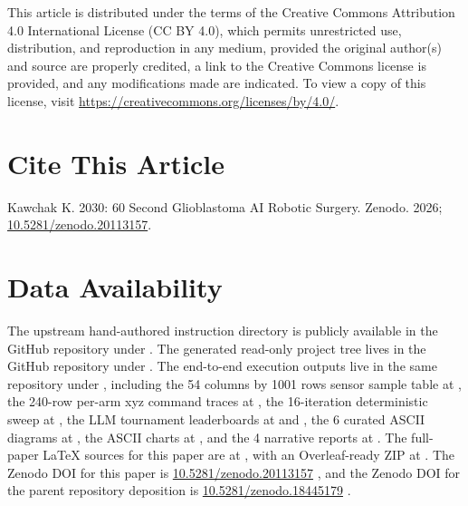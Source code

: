 This article is distributed under the terms of the Creative Commons
Attribution 4.0 International License (CC BY 4.0), which permits
unrestricted use, distribution, and reproduction in any medium,
provided the original author(s) and source are properly credited, a
link to the Creative Commons license is provided, and any
modifications made are indicated. To view a copy of this license,
visit \url{https://creativecommons.org/licenses/by/4.0/}.

{}
\section*{Cite This Article}
\label{sec:cite}

Kawchak K. 2030: 60 Second Glioblastoma AI Robotic Surgery. Zenodo.
2026; \href{https://doi.org/10.5281/zenodo.20113157}{10.5281/zenodo.20113157}.

{}
\section*{Data Availability}
\label{sec:data}

The upstream hand-authored instruction directory is publicly available
in the  GitHub
repository under
\cite{one-minute-variant-instructions}. The generated read-only
project tree lives in the  GitHub
repository under 
\cite{repo-robotic-surgeries}. The end-to-end execution outputs live
in the same repository under , including
the 54 columns by 1001 rows sensor sample table at
, the
240-row per-arm xyz command traces at
, the 16-iteration
deterministic sweep at , the
LLM tournament leaderboards at
 and
, the 6 curated
ASCII diagrams at , the ASCII
charts at , and the 4 narrative
reports at . The full-paper
LaTeX sources for this paper are at
, with an Overleaf-ready ZIP at
. The Zenodo DOI
for this paper is
\href{https://doi.org/10.5281/zenodo.20113157}{10.5281/zenodo.20113157}
\cite{kawchak_2026_20113157}, and the Zenodo DOI for the parent
repository deposition is
\href{https://doi.org/10.5281/zenodo.18445179}{10.5281/zenodo.18445179}
\cite{repo-robotic-surgeries}.
